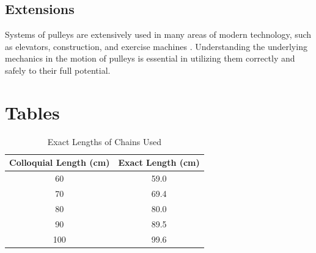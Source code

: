 \documentclass[stu,biblatex,floatsintext]{apa7}
\begin{document}
\subsection{Extensions}
Systems of pulleys are extensively used in many areas of modern technology, such as elevators, construction, and exercise machines \parencite{Vork2018PulleyExamples}. Understanding the underlying mechanics in the motion of pulleys is essential in utilizing them correctly and safely to their full potential.

\printbibliography

\appendix

\section{Tables}

\begin{table}
	\centering
	\caption{Exact Lengths of Chains Used}
	\label{tab:exact-lengths}
	\begin{tabular}{|c|c|}
		\hline
    	Colloquial Length (\unit{\centi\meter}) & Exact Length (\unit{\centi\meter}) \\
		\hline
		60 & 59.0 \\
		\hline
		70 & 69.4 \\
		\hline
		80 & 80.0 \\
		\hline
		90 & 89.5 \\
		\hline
		100 & 99.6 \\
		\hline
    \end{tabular}
\end{table}
\end{document}
